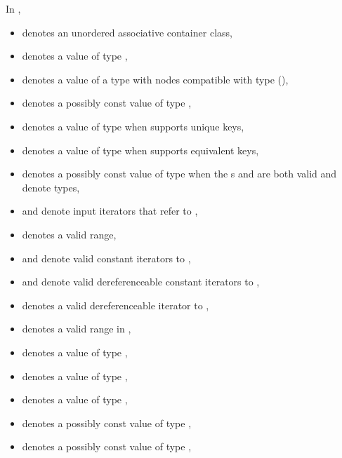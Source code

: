 \pnum
{}%
%
%
%
%
%
In ,
\begin{itemize}
\item
{} denotes an unordered associative container class,
\item
{} denotes a value of type ,
\item
{} denotes a value of a type with nodes compatible
  with type  (),
\item
{} denotes a possibly const value of type ,
\item
{} denotes a value of type 
  when  supports unique keys,
\item
{} denotes a value of type 
  when  supports equivalent keys,
\item
{} denotes a possibly const value of type 
  when the s
   and
  are both valid and denote types,
\item
{} and  denote input iterators
  that refer to ,
\item
{} denotes a valid range,
\item
{} and  denote valid constant iterators to ,
\item
{} and  denote
  valid dereferenceable constant iterators to ,
\item
{} denotes a valid dereferenceable iterator to ,
\item
\tcode{[q1, q2)} denotes a valid range in ,
\item
{} denotes a value of type ,
\item
{} denotes a value of type ,
\item
{} denotes a value of type ,
\item
{} denotes a possibly const value of type ,
\item
{} denotes a possibly const value of type ,

\end{itemize}
